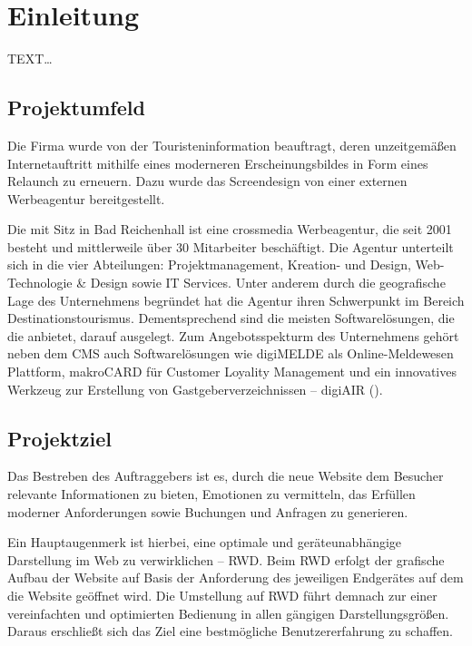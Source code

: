 \section{Einleitung}
\label{sec:Einleitung}
TEXT\ldots 

\subsection{Projektumfeld} 
\label{sec:Projektumfeld}
Die Firma \mh wurde von der Touristeninformation \kunde beauftragt, deren
unzeitgemäßen Internetauftritt mithilfe eines moderneren Erscheinungsbildes in
Form eines Relaunch zu erneuern. Dazu wurde das Screendesign von einer
externen Werbeagentur bereitgestellt.

Die \mh mit Sitz in Bad Reichenhall ist eine crossmedia Werbeagentur, 
die seit 2001 besteht und mittlerweile über 30 Mitarbeiter beschäftigt. 
Die Agentur unterteilt sich in die vier
Abteilungen: Projektmanagement, Kreation- und Design, Web-Technologie \& Design
sowie IT Services. Unter anderem durch die geografische Lage des Unternehmens 
begründet hat die Agentur ihren Schwerpunkt im Bereich Destinationstourismus.
Dementsprechend sind die meisten Softwarelösungen, die die \mh anbietet, darauf ausgelegt.
Zum Angebotsspekturm des Unternehmens gehört neben dem \ac{CMS} \ct 
auch Softwarelösungen wie digiMELDE als Online-Meldewesen Plattform, makroCARD
für Customer Loyality Management und ein innovatives Werkzeug zur
Erstellung von Gastgeberverzeichnissen -- digiAIR ().



\subsection{Projektziel} 
\label{sec:Projektziel}

Das Bestreben des Auftraggebers ist es, durch die neue Website dem Besucher
relevante Informationen zu bieten, Emotionen zu vermitteln, das Erfüllen
moderner Anforderungen sowie Buchungen und Anfragen zu generieren.

Ein Hauptaugenmerk ist hierbei, eine optimale und geräteunabhängige Darstellung
im Web zu verwirklichen -- \ac{RWD}. Beim \ac{RWD} erfolgt der
grafische Aufbau der Website auf Basis der Anforderung des jeweiligen Endgerätes
auf dem die Website geöffnet wird. Die Umstellung auf \ac{RWD} führt demnach
zur einer vereinfachten und optimierten Bedienung in allen gängigen
Darstellungsgrößen. Daraus erschließt sich das Ziel eine bestmögliche
Benutzererfahrung zu schaffen.

